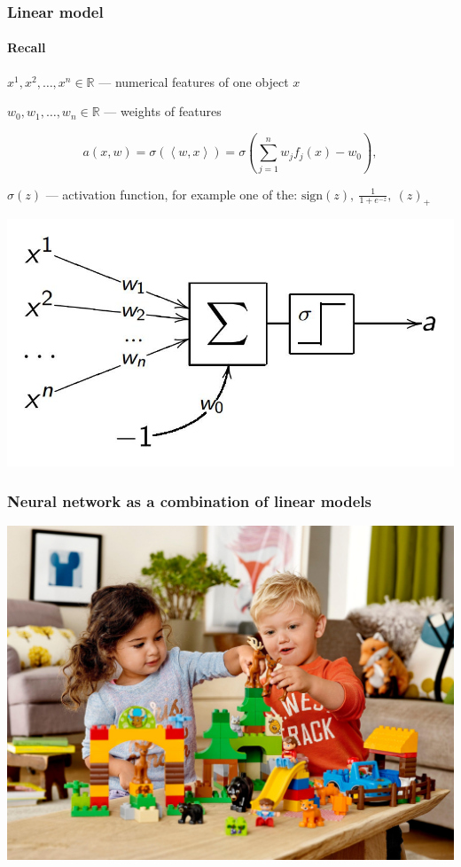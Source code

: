 \documentclass[fullscreen=true, bookmarks=true, hyperref={pdfencoding=unicode}]{beamer}
\begin{document}
\begin{frame}
  \frametitle{Linear model}
  \framesubtitle{Recall}

 $x^1, x^2, \dots, x^n \in \mathbb{R}$ — numerical features of one object $x$
 
 $w_0, w_1, \dots, w_n \in \mathbb{R}$ — weights of features
 
 $$a(x, w) = \sigma(\left<w, x\right>) = \sigma \left(\sum\limits_{j=1}^n w_j f_j(x) - w_0 \right),$$
 
 $\sigma(z)$ — activation function, for example one of the:
 $\text{sign}(z),\ \frac{1}{1+e^{-z}},\ (z)_+$

\begin{center}
  \includegraphics[keepaspectratio, width=.5\paperwidth]{lin_as_nn.jpg}
\end{center}


\end{frame}


\begin{frame}
  \frametitle{Neural network as a combination of linear models}
  \begin{center}
    \includegraphics[keepaspectratio,
                     height=0.8\paperheight]{nn-as-lego-duplo.jpg}
  \end{center}

\end{frame}
\end{document}
